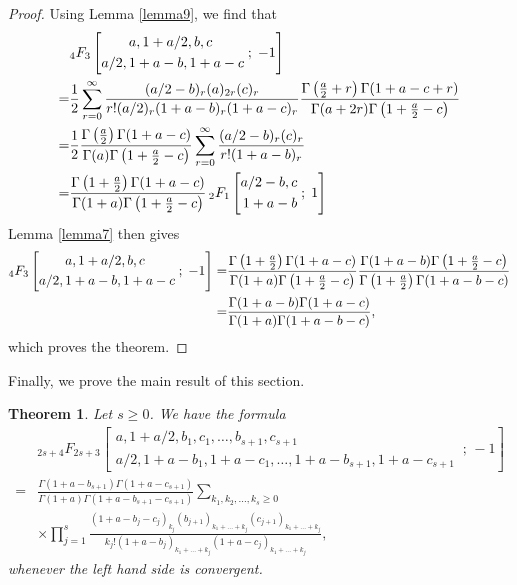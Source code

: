 \documentclass[reqno]{amsart}
\newtheorem{theorem}{Theorem}[section]
\theoremstyle{definition}
\theoremstyle{remark}
\numberwithin{equation}{section}
\begin{document}
\begin{proof}
Using Lemma \ref{lemma9}, we find that
\begin{align*}
&_4F_3\left[\begin{aligned} a, 1+a/2, b, c\hspace{0.8cm}\\ a/2, 1+a-b, 1+a-c\end{aligned}\;;\; -1\right]\\=&\frac{1}{2}\sum_{r=0}^{\infty}\frac{(a/2-b)_r(a)_{2r}(c)_r}{r! (a/2)_r(1+a-b)_r(1+a-c)_r}\frac{{\displaystyle}\Gamma\left(\frac{a}{2}+r\right)\Gamma(1+a-c+r)}
{{\displaystyle}\Gamma(a+2r)\Gamma\left(1+\frac{a}{2}-c\right)}\\
=&\frac{1}{2}\frac{{\displaystyle}\Gamma\left(\frac{a}{2}\right)\Gamma(1+a-c)}
{{\displaystyle}\Gamma(a)\Gamma\left(1+\frac{a}{2}-c\right)}\sum_{r=0}^{\infty}\frac{(a/2-b)_r(c)_r}{r! (1+a-b)_r}\\
=&\frac{{\displaystyle}\Gamma\left(1+\frac{a}{2}\right)\Gamma(1+a-c)}
{{\displaystyle}\Gamma(1+a)\Gamma\left(1+\frac{a}{2}-c\right)}\,_2F_1\left[\begin{aligned} a/2-b, c \\1+a-b\end{aligned}\;;\;1\right]\end{align*}
Lemma \ref{lemma7} then gives
\begin{align*}
_4F_3\left[\begin{aligned} a, 1+a/2, b, c\hspace{0.8cm}\\ a/2, 1+a-b, 1+a-c\end{aligned}\;;\; -1\right]=&\frac{{\displaystyle}\Gamma\left(1+\frac{a}{2}\right)\Gamma(1+a-c)}
{{\displaystyle}\Gamma(1+a)\Gamma\left(1+\frac{a}{2}-c\right)}\frac{{\displaystyle}\Gamma(1+a-b)\Gamma\left(1+\frac{a}{2}-c\right)}{{\displaystyle}\Gamma\left(1+\frac{a}{2}\right)\Gamma(1+a-b-c)}\\
=&\frac{\Gamma(1+a-b)\Gamma(1+a-c)}{\Gamma(1+a)\Gamma(1+a-b-c)},
\end{align*}which proves the theorem.
\end{proof}
Finally, we prove the main result of this section.
\begin{theorem}\label{theorem7}Let $s\geq 0$. We have the formula
\begin{align*}
&_{2s+4}F_{2s+3}\left[\begin{aligned}a, 1+a/2, b_1, c_1, \ldots, b_{s+1}, c_{s+1} \hspace{2cm}\\a/2, 1+a-b_1, 1+a-c_1, \ldots, 1+a-b_{s+1}, 1+a-c_{s+1}\end{aligned}\,;\,-1\right]\\
=&\frac{\Gamma(1+a-b_{s+1})\Gamma(1+a-c_{s+1})}{\Gamma(1+a)\Gamma(1+a-b_{s+1}-c_{s+1})}\sum_{k_1, k_2, \ldots, k_s\geq 0} \\
&\times \prod_{j=1}^s \frac{(1+a-b_j-c_j)_{k_j}(b_{j+1})_{k_1+\ldots+k_j}(c_{j+1})_{k_1+\ldots+k_j}}{k_j!(1+a-b_j)_{k_1+\ldots+k_j}(1+a-c_j)_{k_1+\ldots+k_j}},
\end{align*}whenever the left hand side is convergent.
\end{theorem}
\end{document}

